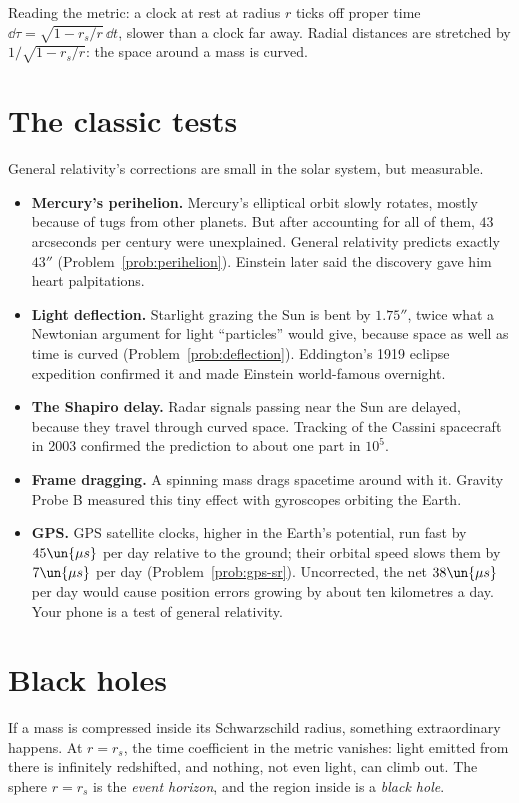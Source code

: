 Reading the metric: a clock at rest at radius $r$ ticks off proper time $\dd\tau = \sqrt{1-r_s/r}\,\dd t$, slower than a clock far away. Radial distances are stretched by $1/\sqrt{1-r_s/r}$: the space around a mass is curved.

\section{The classic tests}

General relativity's corrections are small in the solar system, but measurable.
\begin{itemize}[itemsep=4pt]
  \item \textbf{Mercury's perihelion.} Mercury's elliptical orbit slowly rotates, mostly because of tugs from other planets. But after accounting for all of them, $43$ arcseconds per century were unexplained. General relativity predicts exactly $43''$ (Problem~\ref{prob:perihelion}). Einstein later said the discovery gave him heart palpitations.
  \item \textbf{Light deflection.} Starlight grazing the Sun is bent by $1.75''$, twice what a Newtonian argument for light ``particles'' would give, because space as well as time is curved (Problem~\ref{prob:deflection}). Eddington's 1919 eclipse expedition confirmed it and made Einstein world-famous overnight.
  \item \textbf{The Shapiro delay.} Radar signals passing near the Sun are delayed, because they travel through curved space. Tracking of the Cassini spacecraft in 2003 confirmed the prediction to about one part in $10^5$.
  \item \textbf{Frame dragging.} A spinning mass drags spacetime around with it. Gravity Probe B measured this tiny effect with gyroscopes orbiting the Earth.
  \item \textbf{GPS.} GPS satellite clocks, higher in the Earth's potential, run fast by $45\un{\mu s}$ per day relative to the ground; their orbital speed slows them by $7\un{\mu s}$ per day (Problem~\ref{prob:gps-sr}). Uncorrected, the net $38\un{\mu s}$ per day would cause position errors growing by about ten kilometres a day. Your phone is a test of general relativity.
\end{itemize}

\section{Black holes}

If a mass is compressed inside its Schwarzschild radius, something extraordinary happens. At $r = r_s$, the time coefficient in the metric vanishes: light emitted from there is infinitely redshifted, and nothing, not even light, can climb out. The sphere $r = r_s$ is the \emph{event horizon}, and the region inside is a \emph{black hole}.

